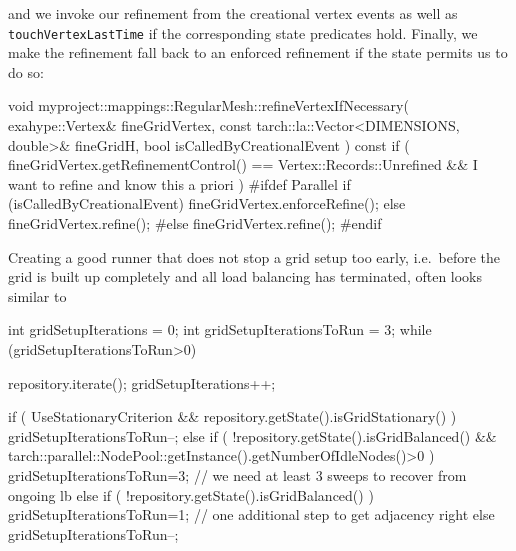 \noindent
and we invoke our refinement from the creational vertex events as well as
\texttt{touchVertexLastTime} if the corresponding state predicates hold.
Finally, we make the refinement fall back to an enforced refinement if the state
permits us to do so:
\begin{code}
void myproject::mappings::RegularMesh::refineVertexIfNecessary(
  exahype::Vertex&                              fineGridVertex,
  const tarch::la::Vector<DIMENSIONS, double>&  fineGridH,
  bool                                          isCalledByCreationalEvent
) const {
  if (
    fineGridVertex.getRefinementControl() == Vertex::Records::Unrefined
    &&
    I want to refine and know this a priori
  ) {
    #ifdef Parallel
    if (isCalledByCreationalEvent) {
      fineGridVertex.enforceRefine();
    }
    else {
      fineGridVertex.refine();
    }
    #else
    fineGridVertex.refine();
    #endif
  }
}
\end{code}


\noindent
Creating a good runner that does not stop a grid setup too early, i.e.~before
the grid is built up completely and all load balancing has terminated, often
looks similar to
\begin{code}
int gridSetupIterations      = 0;
int gridSetupIterationsToRun = 3;
while (gridSetupIterationsToRun>0) {
  repository.iterate();
  gridSetupIterations++;
   
  if ( UseStationaryCriterion && repository.getState().isGridStationary() ) {
    gridSetupIterationsToRun--;
  }
  else if ( !repository.getState().isGridBalanced() && 
    tarch::parallel::NodePool::getInstance().getNumberOfIdleNodes()>0 ) {
    gridSetupIterationsToRun=3;  // we need at least 3 sweeps to recover from ongoing lb 
  }
  else if ( !repository.getState().isGridBalanced()  ) {
    gridSetupIterationsToRun=1;  // one additional step to get adjacency right
  }
  else {
    gridSetupIterationsToRun--;
  }
}
\end{code}


